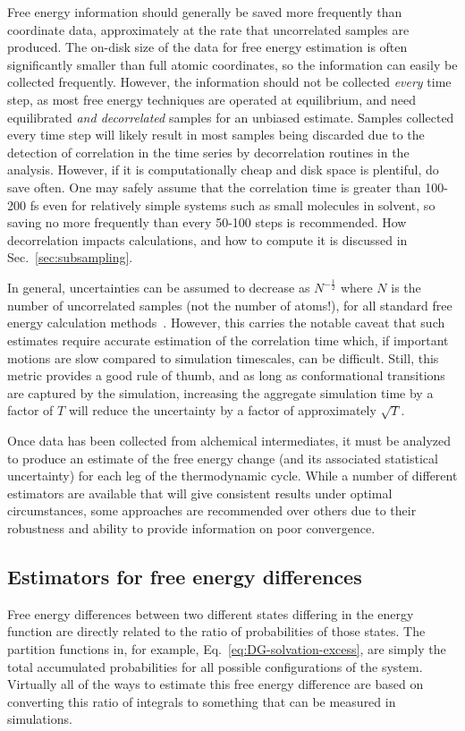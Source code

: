 Free energy information should generally be saved more frequently than coordinate data, approximately at the rate that uncorrelated samples are produced.  
The on-disk size of the data for free energy estimation is often significantly smaller than full atomic coordinates, so the information can easily be collected frequently. 
However, the information should not be collected \textit{every} time step, as most free energy techniques are operated at equilibrium, and need equilibrated \textit{and decorrelated} samples for an unbiased estimate.
Samples collected every time step will likely result in most samples being discarded due to the detection of correlation in the time series by decorrelation routines in the analysis. However, if it is computationally cheap and disk space is plentiful, do save often. One may safely assume that the correlation time is greater than 100-200 fs even for relatively simple systems such as small molecules in solvent, so saving no more frequently than every 50-100 steps is recommended. 
How decorrelation impacts calculations, and how to compute it is discussed in Sec.~\ref{sec:subsampling}.

In general, uncertainties can be assumed to decrease as $N^{-\frac{1}{2}}$ where $N$ is the number of uncorrelated samples (not the number of atoms!), for all standard free energy calculation methods~\cite{shirts2005comparison}. However, this carries the notable caveat that such estimates require accurate estimation of the correlation time which, if important motions are slow compared to simulation timescales, can be difficult. Still, this metric provides a good rule of thumb, and as long as conformational transitions are captured by the simulation, increasing the aggregate simulation time by a factor of $T$ will reduce the uncertainty by a factor of approximately $\sqrt{T}$.

Once data has been collected from alchemical intermediates, it must be analyzed to produce an estimate of the free energy change (and its associated statistical uncertainty) for each leg of the thermodynamic cycle.
While a number of different estimators are available that will give consistent results under optimal circumstances, some approaches are recommended over others due to their robustness and ability to provide information on poor convergence.

\subsection{Estimators for free energy differences}
\label{subsec:estimators}
Free energy differences between two different states differing in the energy function are directly related to the
ratio of probabilities of those states.
The partition functions in, for example, Eq.~\ref{eq:DG-solvation-excess}, are simply the total accumulated probabilities for all possible configurations of the system. Virtually all of the ways to estimate this free energy difference are based on converting this ratio of integrals to something that can be measured in simulations.  


